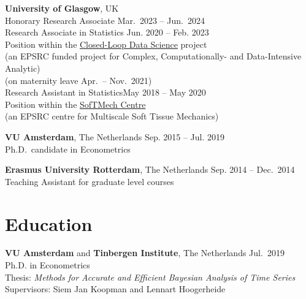 \documentclass[margin,line]{resume}
\begin{document}
\begin{resume}
    \vspace{-2mm}
    \textbf{University of Glasgow},  UK \\
	Honorary Research Associate \hfill Mar.\ 2023 -- Jun.\ 2024 \vspace{2mm}\\
%              
	Research Associate in Statistics \hfill  Jun. 2020  -- Feb. 2023 \\
    Position within the \href{https://www.gla.ac.uk/schools/computing/research/researchsections/ida-section/closedloop/}{Closed-Loop Data Science} project\\
    (an EPSRC funded project for Complex, Computationally- and Data-Intensive Analytic)\\
    (on maternity leave Apr.\ -- Nov.\ 2021)\vspace{2mm}\\
%
	Research Assistant in Statistics\hfill  May 2018 -- May 2020 \\
    Position within the \href{http://softmech.org/}{SofTMech Centre}\\
    (an EPSRC centre for Multiscale Soft Tissue Mechanics)  %
%     
   
    \textbf{VU Amsterdam},  The Netherlands \hfill Sep. 2015 -- Jul. 2019\\
	Ph.D.\ candidate in Econometrics  
    \vspace{-2mm}
    
    \textbf{Erasmus University Rotterdam},  The Netherlands \hfill Sep. 2014 -- Dec.\ 2014\\
	Teaching Assistant for graduate level courses\\ 
	
\vspace{-5mm}    
    \section{\mysidestyle Education}
    \textbf{VU Amsterdam} and \textbf{Tinbergen Institute},  The Netherlands \hfill Jul.\ 2019\\
	Ph.D. in Econometrics\\
	Thesis: \textit{Methods for Accurate and Efficient Bayesian Analysis of Time Series}\\ 
    Supervisors: Siem Jan Koopman and Lennart Hoogerheide
\vspace{-2mm}


\end{resume}
\end{document}
